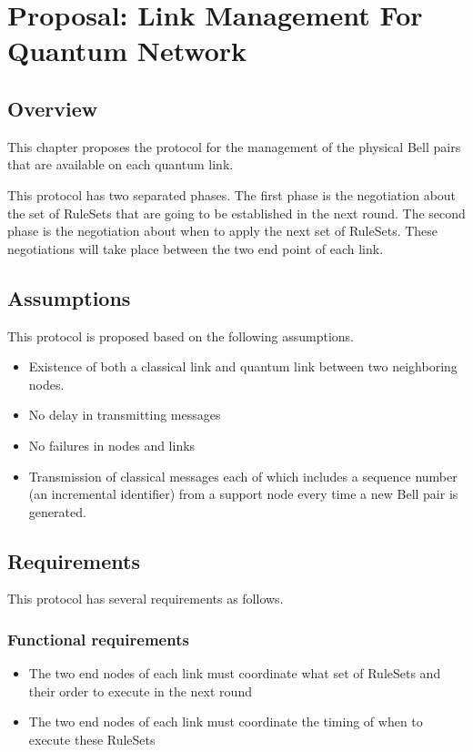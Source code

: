 \chapter{Proposal: Link Management For Quantum Network}
\label{proposal}

\section{Overview}

This chapter proposes the protocol for the management of the physical Bell pairs that are available on each quantum link.

This protocol has two separated phases. The first phase is the negotiation about the set of RuleSets that are going to be established in the next round. The second phase is the negotiation about when to apply the next set of RuleSets.
These negotiations will take place between the two end point of each link.

\section{Assumptions}

This protocol is proposed based on the following assumptions.

\begin{itemize}
  \item Existence of both a classical link and quantum link between two neighboring nodes.
  \item No delay in transmitting messages 
  \item No failures in nodes and links
  \item Transmission of classical messages each of which includes a sequence number (an incremental identifier) from a support node every time a new Bell pair is generated.
\end{itemize}

\section{Requirements}

This protocol has several requirements as follows.

\subsection{Functional requirements}

\begin{itemize}
  \item The two end nodes of each link must coordinate what set of RuleSets and their order to execute in the next round
  \item The two end nodes of each link must coordinate the timing of when to execute these RuleSets
\end{itemize}

